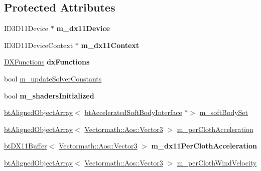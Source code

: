 \subsection*{Protected Attributes}
\begin{DoxyCompactItemize}
\item 
\mbox{\label{classbtDX11SoftBodySolver_a752ae6c92116602dbdc970b935b7dc72}} 
I\+D3\+D11\+Device $\ast$ {\bfseries m\+\_\+dx11\+Device}
\item 
\mbox{\label{classbtDX11SoftBodySolver_ae5aa5fb0b81772aabc9b21c409a76c6f}} 
I\+D3\+D11\+Device\+Context $\ast$ {\bfseries m\+\_\+dx11\+Context}
\item 
\mbox{\label{classbtDX11SoftBodySolver_a5e4e8a4bd7edb29d3de843fd2a93b0d3}} 
\hyperlink{classDXFunctions}{D\+X\+Functions} {\bfseries dx\+Functions}
\item 
bool \hyperlink{classbtDX11SoftBodySolver_a15ab079a7dde751958b96341c4bcb08b}{m\+\_\+update\+Solver\+Constants}
\item 
\mbox{\label{classbtDX11SoftBodySolver_a29a347f3de2f18c00645f5258e519b8d}} 
bool {\bfseries m\+\_\+shaders\+Initialized}
\item 
\hyperlink{classbtAlignedObjectArray}{bt\+Aligned\+Object\+Array}$<$ \hyperlink{classbtDX11SoftBodySolver_1_1btAcceleratedSoftBodyInterface}{bt\+Accelerated\+Soft\+Body\+Interface} $\ast$$>$ \hyperlink{classbtDX11SoftBodySolver_aa7f958873014d55c566a9040f585b415}{m\+\_\+soft\+Body\+Set}
\item 
\hyperlink{classbtAlignedObjectArray}{bt\+Aligned\+Object\+Array}$<$ \hyperlink{classVectormath_1_1Aos_1_1Vector3}{Vectormath\+::\+Aos\+::\+Vector3} $>$ \hyperlink{classbtDX11SoftBodySolver_a78b69812eb1dad36cc177d2b5b22dd15}{m\+\_\+per\+Cloth\+Acceleration}
\item 
\mbox{\label{classbtDX11SoftBodySolver_a90ebcd0a4e0a7b1860338836fce19716}} 
\hyperlink{classbtDX11Buffer}{bt\+D\+X11\+Buffer}$<$ \hyperlink{classVectormath_1_1Aos_1_1Vector3}{Vectormath\+::\+Aos\+::\+Vector3} $>$ {\bfseries m\+\_\+dx11\+Per\+Cloth\+Acceleration}
\item 
\hyperlink{classbtAlignedObjectArray}{bt\+Aligned\+Object\+Array}$<$ \hyperlink{classVectormath_1_1Aos_1_1Vector3}{Vectormath\+::\+Aos\+::\+Vector3} $>$ \hyperlink{classbtDX11SoftBodySolver_a987c1c220a3f6c88c67bf2c1d781f3e6}{m\+\_\+per\+Cloth\+Wind\+Velocity}
$$
\end{DoxyCompactItemize}

